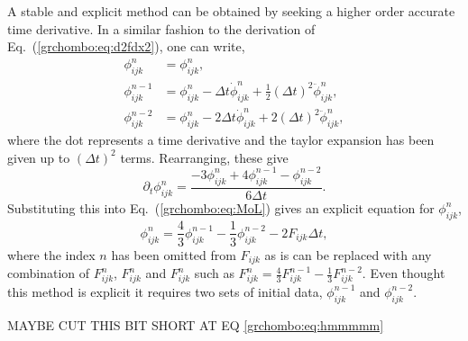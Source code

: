 A stable and explicit method can be obtained by seeking a higher order accurate time derivative. In a similar fashion to the derivation of Eq.~(\ref{grchombo:eq:d2fdx2}), one can write,
\begin{align}
\phi^n_{ijk} &= \phi^n_{ijk},\\
\phi^{n-1}_{ijk} &= \phi^n_{ijk} - \Delta t \dot{\phi}^n_{ijk} + \frac{1}{2}(\Delta t)^2 \ddot{\phi}^n_{ijk},\\
\phi^{n-2}_{ijk} &= \phi^n_{ijk} - 2\Delta t \dot{\phi}^n_{ijk} + 2(\Delta t)^2 \ddot{\phi}^n_{ijk},
\end{align}
where the dot represents a time derivative and the taylor expansion has been given up to $(\Delta t)^2$ terms. Rearranging, these give
\begin{equation}
\partial_t \phi^n_{ijk} = \frac{-3 \phi^n_{ijk} + 4 \phi^{n-1}_{ijk} - \phi^{n-2}_{ijk}}{6 \Delta t}. \label{grchombo:eq:hmmmmm}
\end{equation}
Substituting this into Eq.~(\ref{grchombo:eq:MoL}) gives an explicit equation for $\phi^n_{ijk}$,
\begin{equation}
\phi^n_{ijk} = \frac{4}{3}\phi^{n-1}_{ijk} - \frac{1}{3}\phi^{n-2}_{ijk} - 2 F_{ijk} \Delta t,
\end{equation}
where the index $n$ has been omitted from $F_{ijk}$ as is can be replaced with any combination of $F^n_{ijk}$, $F^n_{ijk}$ and $F^n_{ijk}$ such as $F^n_{ijk} = \frac{4}{3}F^{n-1}_{ijk}-\frac{1}{3}F^{n-2}_{ijk}$. Even thought this method is explicit it requires two sets of initial data, $\phi^{n-1}_{ijk}$ and $\phi^{n-2}_{ijk}$. 

MAYBE CUT THIS BIT SHORT AT EQ \ref{grchombo:eq:hmmmmm} 

